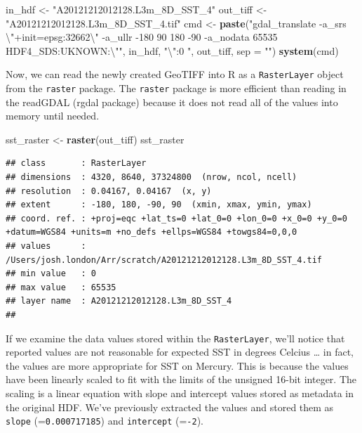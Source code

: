 \documentclass[]{article}
\newenvironment{Shaded}{}{}
\newcommand{\KeywordTok}[1]{\textcolor[rgb]{0.00,0.44,0.13}{\textbf{{#1}}}}
\newcommand{\DataTypeTok}[1]{\textcolor[rgb]{0.56,0.13,0.00}{{#1}}}
\newcommand{\CharTok}[1]{\textcolor[rgb]{0.25,0.44,0.63}{{#1}}}
\newcommand{\StringTok}[1]{\textcolor[rgb]{0.25,0.44,0.63}{{#1}}}
\newcommand{\NormalTok}[1]{{#1}}
\begin{document}
\begin{Shaded}
\begin{Highlighting}[]
\NormalTok{in_hdf <- }\StringTok{"A20121212012128.L3m_8D_SST_4"}
\NormalTok{out_tiff <- }\StringTok{"A20121212012128.L3m_8D_SST_4.tif"}
\NormalTok{cmd <- }\KeywordTok{paste}\NormalTok{(}\StringTok{"gdal_translate -a_srs }\CharTok{\textbackslash{}"}\StringTok{+init=epsg:32662}\CharTok{\textbackslash{}"}\StringTok{ -a_ullr -180 90 180 -90 -a_nodata 65535 HDF4_SDS:UKNOWN:}\CharTok{\textbackslash{}"}\StringTok{"}\NormalTok{, }
    \NormalTok{in_hdf, }\StringTok{"}\CharTok{\textbackslash{}"}\StringTok{:0 "}\NormalTok{, out_tiff, }\DataTypeTok{sep =} \StringTok{""}\NormalTok{)}
\KeywordTok{system}\NormalTok{(cmd)}
\end{Highlighting}
\end{Shaded}
Now, we can read the newly created GeoTIFF into R as a
\texttt{RasterLayer} object from the \texttt{raster} package. The
\texttt{raster} package is more efficient than reading in the readGDAL
(rgdal package) because it does not read all of the values into memory
until needed.

\begin{Shaded}
\begin{Highlighting}[]
\NormalTok{sst_raster <- }\KeywordTok{raster}\NormalTok{(out_tiff)}
\NormalTok{sst_raster}
\end{Highlighting}
\end{Shaded}
\begin{verbatim}
## class       : RasterLayer 
## dimensions  : 4320, 8640, 37324800  (nrow, ncol, ncell)
## resolution  : 0.04167, 0.04167  (x, y)
## extent      : -180, 180, -90, 90  (xmin, xmax, ymin, ymax)
## coord. ref. : +proj=eqc +lat_ts=0 +lat_0=0 +lon_0=0 +x_0=0 +y_0=0 +datum=WGS84 +units=m +no_defs +ellps=WGS84 +towgs84=0,0,0 
## values      : /Users/josh.london/Arr/scratch/A20121212012128.L3m_8D_SST_4.tif 
## min value   : 0 
## max value   : 65535 
## layer name  : A20121212012128.L3m_8D_SST_4 
## 
\end{verbatim}

If we examine the data values stored within the \texttt{RasterLayer},
we'll notice that reported values are not reasonable for expected SST in
degrees Celcius \ldots{} in fact, the values are more appropriate for
SST on Mercury. This is because the values have been linearly scaled to
fit with the limits of the unsigned 16-bit integer. The scaling is a
linear equation with slope and intercept values stored as metadata in
the original HDF. We've previously extracted the values and stored them
as \texttt{slope} (=\texttt{0.000717185}) and \texttt{intercept}
(=\texttt{-2}).
\end{document}
